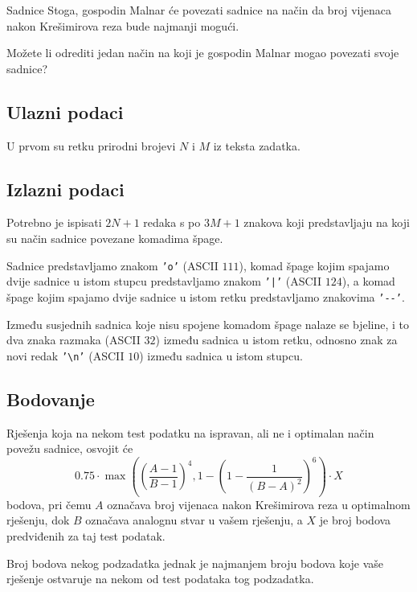 \begin{statement}[
  problempoints=100,
  timelimit=3 sekunde,
  memorylimit=512 MiB,
]{Sadnice}
Stoga, gospodin Malnar će povezati sadnice na način da broj vijenaca nakon
Krešimirova reza bude najmanji mogući.

Možete li odrediti jedan način na koji je gospodin Malnar mogao povezati
svoje sadnice?

\subsection*{Ulazni podaci}
U prvom su retku prirodni brojevi $N$ i $M$ iz teksta zadatka.

\subsection*{Izlazni podaci}
Potrebno je ispisati $2N+1$ redaka s po $3M+1$ znakova koji predstavljaju
na koji su način sadnice povezane komadima špage.

Sadnice predstavljamo znakom \texttt{'o'} (ASCII $111$), komad špage kojim
spajamo dvije sadnice u istom stupcu predstavljamo znakom \texttt{'|'} (ASCII
$124$), a komad špage kojim spajamo dvije sadnice u istom retku predstavljamo
znakovima \texttt{'-{}-'}.

Između susjednih sadnica koje nisu spojene komadom
špage nalaze se bjeline, i to dva znaka razmaka (ASCII $32$) između sadnica u
istom retku, odnosno znak za novi redak \texttt{'\textbackslash{}n'} (ASCII $10$)
između sadnica u istom stupcu.

\subsection*{Bodovanje}
Rješenja koja na nekom test podatku na ispravan, ali ne i optimalan način
povežu sadnice, osvojit će
$$ 0.75 \cdot \max \left(
\left( \frac{A - 1}{B - 1} \right)^4,
1 - \left( 1 - \frac{1}{(B - A)^2} \right)^6
\right) \cdot X$$
bodova, pri čemu $A$ označava broj vijenaca nakon Krešimirova reza u optimalnom
rješenju, dok $B$ označava analognu stvar u vašem rješenju, a $X$ je broj bodova
predviđenih za taj test podatak.

Broj bodova nekog podzadatka jednak je najmanjem broju bodova koje vaše rješenje
ostvaruje na nekom od test podataka tog podzadatka.


\end{statement}
